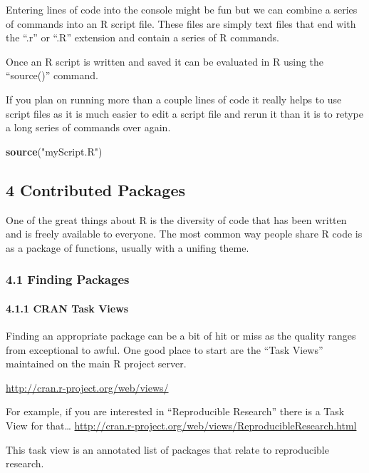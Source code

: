 \documentclass[
]{article}
\newenvironment{Shaded}{\begin{snugshade}}{\end{snugshade}}
\newcommand{\FunctionTok}[1]{\textcolor[rgb]{0.13,0.29,0.53}{\textbf{#1}}}
\newcommand{\NormalTok}[1]{#1}
\newcommand{\StringTok}[1]{\textcolor[rgb]{0.31,0.60,0.02}{#1}}
\begin{document}
Entering lines of code into the console might be fun but we can combine
a series of commands into an R script file. These files are simply text
files that end with the ``.r'' or ``.R'' extension and contain a series
of R commands.

Once an R script is written and saved it can be evaluated in R using the
``source()'' command.

If you plan on running more than a couple lines of code it really helps
to use script files as it is much easier to edit a script file and rerun
it than it is to retype a long series of commands over again.

\begin{Shaded}
\begin{Highlighting}[]
\FunctionTok{source}\NormalTok{(}\StringTok{"myScript.R"}\NormalTok{)}
\end{Highlighting}
\end{Shaded}

\subsection{4 Contributed Packages}\label{contributed-packages}

One of the great things about R is the diversity of code that has been
written and is freely available to everyone. The most common way people
share R code is as a package of functions, usually with a unifing theme.

\subsubsection{4.1 Finding Packages}\label{finding-packages}

\paragraph{4.1.1 CRAN Task Views}\label{cran-task-views}

Finding an appropriate package can be a bit of hit or miss as the
quality ranges from exceptional to awful. One good place to start are
the ``Task Views'' maintained on the main R project server.

\url{http://cran.r-project.org/web/views/}

For example, if you are interested in ``Reproducible Research'' there is
a Task View for that\ldots{}
\url{http://cran.r-project.org/web/views/ReproducibleResearch.html}

This task view is an annotated list of packages that relate to
reproducible research.
\end{document}
